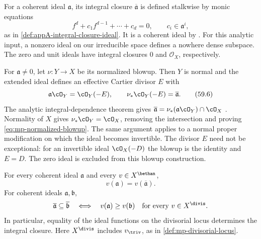 For a coherent ideal $\mathfrak a$, its integral closure
$\overline{\mathfrak a}$ is defined stalkwise by monic equations
\[
 f^d+c_1f^{d-1}+\cdots+c_d=0,
 \qquad c_i\in\mathfrak a^i,
\]
as in \cref{def:appA-integral-closure-ideal}. It is a coherent ideal
by \cite[Theorem~2.9]{LejeuneTeissier08}. For this analytic input,
a nonzero ideal on our irreducible space defines a nowhere dense
subspace. The zero and unit ideals have integral closures $0$ and
$\mathcal O_X$, respectively.

For $\mathfrak a\ne0$, let $\nu:Y\to X$ be its normalized blowup.
Then $Y$ is normal and the extended ideal defines an effective
Cartier divisor $E$ with
\[
 \mathfrak a\cO_Y=\cO_Y(-E),\qquad
 \nu_*\cO_Y(-E)=\overline{\mathfrak a}.
\tag{59.6}\label{eq:mp-normalized-blowup}
\]
The analytic integral-dependence theorem gives
$\overline{\mathfrak a}=\nu_*(\mathfrak a\cO_Y)\cap\cO_X$
\cite[Theorem~2.1 and the proof of Theorem~2.9]{LejeuneTeissier08}.
Normality of $X$ gives $\nu_*\cO_Y=\cO_X$, removing the intersection
and proving \eqref{eq:mp-normalized-blowup}. The same argument
applies to a normal proper modification on which the ideal becomes
invertible. The divisor $E$ need not be exceptional: for an
invertible ideal $\cO_X(-D)$ the blowup is the identity and $E=D$.
The zero ideal is excluded from this blowup construction.

\begin{proposition}\label{prop:mp-integral-closure-values}
For every coherent ideal $\mathfrak a$ and every
$v\in X^{\bethan}$,
\[
                     v(\mathfrak a)=v(\overline{\mathfrak a}).
\tag{59.7}\label{eq:mp-integral-closure-values}
\]
For coherent ideals $\mathfrak a,\mathfrak b$,
\[
 \overline{\mathfrak a}\subseteq\overline{\mathfrak b}
 \quad\Longleftrightarrow\quad
 v(\mathfrak a)\geq v(\mathfrak b)
 \quad\text{for every }v\in X^{\divis}.
\]
In particular, equality of the ideal functions on the divisorial
locus determines the integral closure. Here $X^{\divis}$ includes
$v_{\triv}$, as in \cref{def:mp-divisorial-locus}.
\end{proposition}

